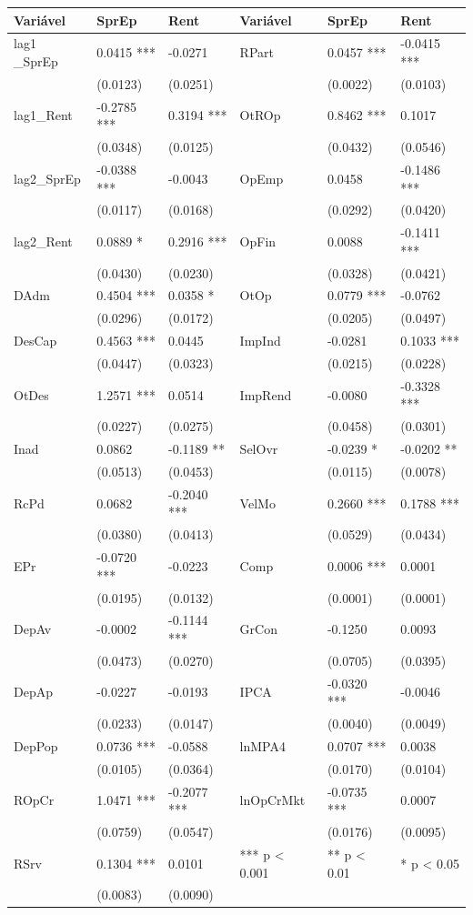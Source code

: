 \documentclass[
  12pt,
  12pt,
  openright,
  oneside,
  a4paper,
  chapter=TITLE,
  section=TITLE,
  subsection=TITLE,
  subsubsection=TITLE,
  portugues,
  sumario=tradicional]{abntex2}
\begin{document}
\begin{longtable}[]{@{}llllll@{}}
\toprule
Variável & SprEp & Rent & Variável & SprEp & Rent \\
\midrule
\endhead
lag1 \_SprEp & 0.0415 *** & -0.0271 & RPart & 0.0457 *** & -0.0415 *** \\
& (0.0123) & (0.0251) & & (0.0022) & (0.0103) \\
lag1\_Rent & -0.2785 *** & 0.3194 *** & OtROp & 0.8462 *** & 0.1017 \\
& (0.0348) & (0.0125) & & (0.0432) & (0.0546) \\
lag2\_SprEp & -0.0388 *** & -0.0043 & OpEmp & 0.0458 & -0.1486 *** \\
& (0.0117) & (0.0168) & & (0.0292) & (0.0420) \\
lag2\_Rent & 0.0889 * & 0.2916 *** & OpFin & 0.0088 & -0.1411 *** \\
& (0.0430) & (0.0230) & & (0.0328) & (0.0421) \\
DAdm & 0.4504 *** & 0.0358 * & OtOp & 0.0779 *** & -0.0762 \\
& (0.0296) & (0.0172) & & (0.0205) & (0.0497) \\
DesCap & 0.4563 *** & 0.0445 & ImpInd & -0.0281 & 0.1033 *** \\
& (0.0447) & (0.0323) & & (0.0215) & (0.0228) \\
OtDes & 1.2571 *** & 0.0514 & ImpRend & -0.0080 & -0.3328 *** \\
& (0.0227) & (0.0275) & & (0.0458) & (0.0301) \\
Inad & 0.0862 & -0.1189 ** & SelOvr & -0.0239 * & -0.0202 ** \\
& (0.0513) & (0.0453) & & (0.0115) & (0.0078) \\
RcPd & 0.0682 & -0.2040 *** & VelMo & 0.2660 *** & 0.1788 *** \\
& (0.0380) & (0.0413) & & (0.0529) & (0.0434) \\
EPr & -0.0720 *** & -0.0223 & Comp & 0.0006 *** & 0.0001 \\
& (0.0195) & (0.0132) & & (0.0001) & (0.0001) \\
DepAv & -0.0002 & -0.1144 *** & GrCon & -0.1250 & 0.0093 \\
& (0.0473) & (0.0270) & & (0.0705) & (0.0395) \\
DepAp & -0.0227 & -0.0193 & IPCA & -0.0320 *** & -0.0046 \\
& (0.0233) & (0.0147) & & (0.0040) & (0.0049) \\
DepPop & 0.0736 *** & -0.0588 & lnMPA4 & 0.0707 *** & 0.0038 \\
& (0.0105) & (0.0364) & & (0.0170) & (0.0104) \\
ROpCr & 1.0471 *** & -0.2077 *** & lnOpCrMkt & -0.0735 *** & 0.0007 \\
& (0.0759) & (0.0547) & & (0.0176) & (0.0095) \\
RSrv & 0.1304 *** & 0.0101 & *** p \textless{} 0.001 & ** p \textless{} 0.01 & * p \textless{} 0.05 \\
& (0.0083) & (0.0090) & & & \\
\bottomrule
\end{longtable}
\end{document}
